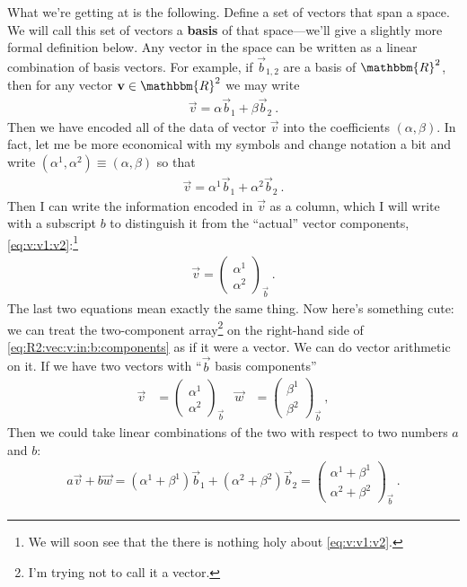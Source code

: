 \documentclass[12pt]{article}
\begin{document}
What we're getting at is the following.  Define a set of vectors that span a space. We will call this set of vectors a \textbf{basis} of that space---we'll give a slightly more formal definition below. Any vector in the space can be written as a linear combination of basis vectors. For example, if $\vec{b}_{1,2}$ are a basis of $\mathbbm{R}^2$, then for any vector $\vec{v}\in\mathbbm{R}^2$ we may write
\begin{align}
    \vec{v} = \alpha \vec{b}_{1} + \beta \vec{b}_2 \ .
\end{align}
Then we have encoded all of the data of vector $\vec{v}$ into the coefficients $(\alpha, \beta)$. In fact, let me be more economical with my symbols and change notation a bit and write $(\alpha^1, \alpha^2) \equiv (\alpha,\beta)$ so that
\begin{align}
    \vec{v} = \alpha^1 \vec{b}_{1} + \alpha^2 \vec{b}_2 \ .
    \label{eq:R2:vec:v:in:b:components:lincomb}
\end{align}
Then I can write the information encoded in $\vec{v}$ as a column, which I will write with a subscript $b$ to distinguish it from the ``actual'' vector components, \eqref{eq:v:v1:v2}:\footnote{We will soon see that the there is nothing holy about \eqref{eq:v:v1:v2}.}
\begin{align}
    \vec{v} = 
    \begin{pmatrix}
        \alpha^1\\
        \alpha^2
    \end{pmatrix}_{\vec{b}} \ .
    \label{eq:R2:vec:v:in:b:components}
\end{align}
The last two equations mean exactly the same thing. Now here's something cute: we can treat the two-component array\footnote{I'm trying not to call it a vector.} on the right-hand side of \eqref{eq:R2:vec:v:in:b:components} as if it were a vector. We can do vector arithmetic on it. If we have two vectors with ``$\vec{b}$ basis components''
\begin{align}
    \vec{v}&=
    \begin{pmatrix}
        \alpha^1\\
        \alpha^2
    \end{pmatrix}_{\vec{b}} 
    &
    \vec{w}&=
    \begin{pmatrix}
        \beta^1\\
        \beta^2
    \end{pmatrix}_{\vec{b}}  \ ,
\end{align}
Then we could take linear combinations of the two with respect to two numbers $a$ and $b$:
\begin{align}
    a\vec{v} + b\vec{w} =
    (\alpha^1+\beta^1) \vec{b}_{1} + (\alpha^2+\beta^2) \vec{b}_2
    =
    \begin{pmatrix}
        \alpha^1 + \beta^1 \\
        \alpha^2 + \beta^2
    \end{pmatrix}_{\vec{b}} \ .
    \label{eq:linear:combination:in:b:basis}
\end{align}
\end{document}
